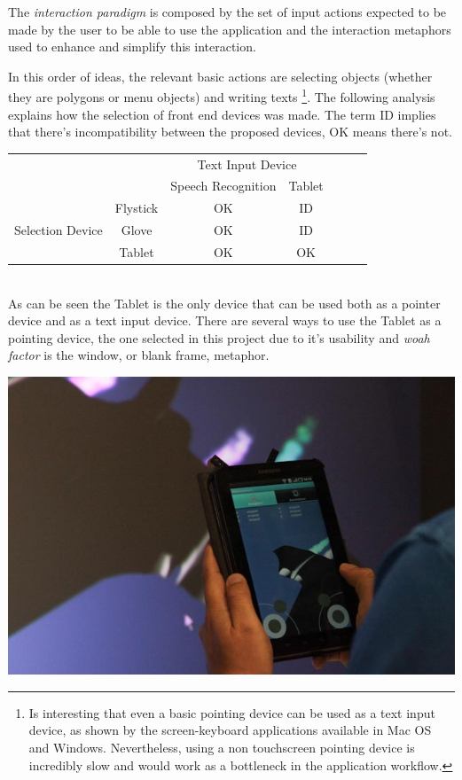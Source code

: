 The \emph{interaction paradigm} is composed by the set of input actions expected to be made by the user to be able to use the application and the interaction metaphors used to enhance and simplify this interaction.

In this order of ideas, the relevant basic actions are selecting objects (whether they are polygons or menu objects) and writing texts \footnote{Is interesting that even a basic pointing device can be used as a text input device, as shown by the screen-keyboard applications available in Mac OS and Windows. Nevertheless, using a non touchscreen pointing device is incredibly slow and would work as a bottleneck in the application workflow.}. The following analysis explains how the selection of front end devices was made. The term ID implies that there's incompatibility between the proposed devices, OK means there's not.

\begin{tabular}{cc|c|c|c|c|l}
\cline{3-4}
& & \multicolumn{2}{|c|}{Text Input Device} \\ \cline{3-4}
& & Speech Recognition & Tablet \\ \cline{1-4}
\multicolumn{1}{|c|}{\multirow{3}{*}{Selection Device}} &
\multicolumn{1}{|c|}{Flystick}& OK & ID     \\ \cline{2-4}
\multicolumn{1}{|c|}{}                        &
\multicolumn{1}{|c|}{Glove} & OK & ID     \\ \cline{2-4}
\multicolumn{1}{|c|}{}                        &
\multicolumn{1}{|c|}{Tablet} & OK & OK \\ \cline{1-4}
\end{tabular}\\

As can be seen the Tablet is the only device that can be used both as a pointer device and as a text input device. There are several ways to use the Tablet as a pointing device, the one selected in this project due to it's usability and \emph{woah factor} is the window, or blank frame, metaphor. 

\begin{center}
\includegraphics[scale=0.5]{Images/window_metaphor.jpg}
\end{center}

